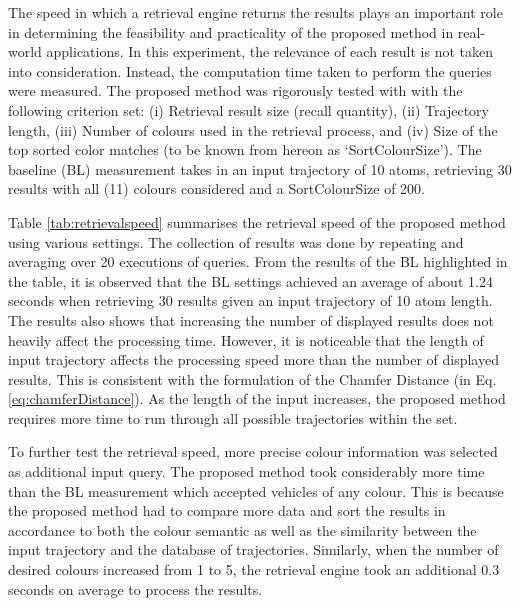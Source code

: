 The speed in which a retrieval engine returns the results plays an important role in determining the feasibility and practicality of the proposed method in real-world applications. In this experiment, the relevance of each result is not taken into consideration. Instead, the computation time taken to perform the queries were measured. The proposed method was rigorously tested with with the following criterion set: (i) Retrieval result size (recall quantity), (ii) Trajectory length, (iii) Number of colours used in the retrieval process, and (iv) Size of the top sorted color matches (to be known from hereon as `SortColourSize'). The baseline (BL) measurement takes in an input trajectory of 10 atoms, retrieving 30 results with all (11) colours considered and a SortColourSize of 200.

Table \ref{tab:retrievalspeed} summarises the retrieval speed of the proposed method using various settings. The collection of results was done by repeating and averaging over 20 executions of queries. From the results of the BL highlighted in the table, it is observed that the BL settings achieved an average of about 1.24 seconds when retrieving 30 results given an input trajectory of 10 atom length. The results also shows that increasing the number of displayed results does not heavily affect the processing time. However, it is noticeable that the length of input trajectory affects the processing speed more than the number of displayed results. This is consistent with the formulation of the Chamfer Distance (in Eq. \ref{eq:chamferDistance}). As the length of the input increases, the proposed method requires more time to run through all possible trajectories within the set.

To further test the retrieval speed, more precise colour information was selected as additional input query. The proposed method took considerably more time than the BL measurement which accepted vehicles of any colour. This is because the proposed method had to compare more data and sort the results in accordance to both the colour semantic as well as the similarity between the input trajectory and the database of trajectories. Similarly, when the number of desired colours increased from 1 to 5, the retrieval engine took an additional 0.3 seconds on average to process the results.

